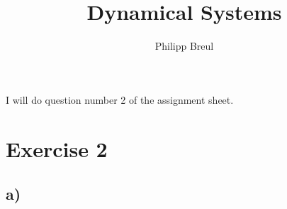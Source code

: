 \documentclass[11pt,a4paper,onecolumn]{article}
\author{Philipp Breul}
\title{Dynamical Systems}
\numberwithin{equation}{section} %
\begin{document}
\maketitle
\begin{center}
I will do question number 2 of the assignment sheet.
\end{center}
\setcounter{secnumdepth}{0}
\section{Exercise 2}
\subsection{a)}

%
\end{document}
